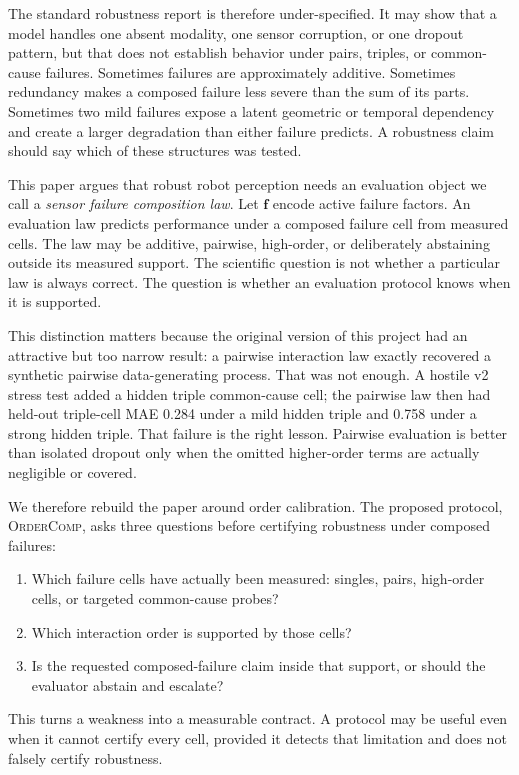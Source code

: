 \documentclass{article}
\newcommand{\method}{\textsc{OrderComp}}
\newcommand{\fvec}{\mathbf{f}}
\begin{document}
The standard robustness report is therefore under-specified. It may show that a model handles one absent modality, one sensor corruption, or one dropout pattern, but that does not establish behavior under pairs, triples, or common-cause failures. Sometimes failures are approximately additive. Sometimes redundancy makes a composed failure less severe than the sum of its parts. Sometimes two mild failures expose a latent geometric or temporal dependency and create a larger degradation than either failure predicts. A robustness claim should say which of these structures was tested.

This paper argues that robust robot perception needs an evaluation object we call a \emph{sensor failure composition law}. Let $\fvec$ encode active failure factors. An evaluation law predicts performance under a composed failure cell from measured cells. The law may be additive, pairwise, high-order, or deliberately abstaining outside its measured support. The scientific question is not whether a particular law is always correct. The question is whether an evaluation protocol knows when it is supported.

This distinction matters because the original version of this project had an attractive but too narrow result: a pairwise interaction law exactly recovered a synthetic pairwise data-generating process. That was not enough. A hostile v2 stress test added a hidden triple common-cause cell; the pairwise law then had held-out triple-cell MAE 0.284 under a mild hidden triple and 0.758 under a strong hidden triple. That failure is the right lesson. Pairwise evaluation is better than isolated dropout only when the omitted higher-order terms are actually negligible or covered.

We therefore rebuild the paper around order calibration. The proposed protocol, \method, asks three questions before certifying robustness under composed failures:
\begin{enumerate}[leftmargin=1.5em,itemsep=0.25em]
    \item Which failure cells have actually been measured: singles, pairs, high-order cells, or targeted common-cause probes?
    \item Which interaction order is supported by those cells?
    \item Is the requested composed-failure claim inside that support, or should the evaluator abstain and escalate?
\end{enumerate}
This turns a weakness into a measurable contract. A protocol may be useful even when it cannot certify every cell, provided it detects that limitation and does not falsely certify robustness.
\end{document}
